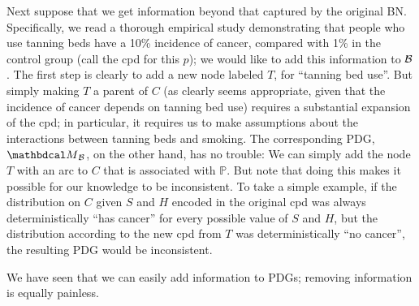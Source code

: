 \begin{example}[emulating a BN]
Next suppose that we get information beyond that captured by the original BN.
Specifically, we read a thorough empirical study demonstrating that people who
use tanning beds have a 10\% incidence of cancer, compared with 1\% in the
control group 
(call the cpd for this $p$); we would like to add this information to
$\cal B$. The first step is clearly to add a new node labeled $T$, for ``tanning
bed use''.  But simply making $T$ a parent of $C$ (as clearly seems appropriate,
given that the incidence of cancer depends on tanning bed use) requires a
substantial expansion of the cpd; in particular, it requires us to make
assumptions about the interactions between tanning beds and smoking.  
The corresponding PDG, $\PDGof{{\mathcal B}}$, on the other hand, has no
trouble: We can simply add the node $T$ with an arc to $C$ that is associated
with $\mathbb P$.  But note that doing this makes it possible for our knowledge to
be inconsistent. To take a simple example, if the distribution on $C$ given $S$
and $H$ encoded in the original cpd was always deterministically ``has cancer''
for every possible value of $S$ and $H$, but the distribution according to the
new cpd from $T$ was deterministically ``no cancer'', the resulting PDG would be
inconsistent.  
\end{example}


We have seen that we can easily add information to PDGs; removing information is
equally painless.   

